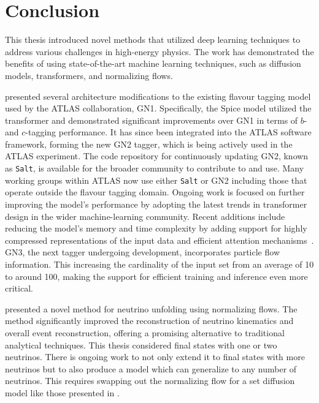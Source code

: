 \chapter{Conclusion}
\label{ch:conclusion}

This thesis introduced novel methods that utilized deep learning techniques to address various challenges in high-energy physics.
The work has demonstrated the benefits of using state-of-the-art machine learning techniques, such as diffusion models, transformers, and normalizing flows.

 presented several architecture modifications to the existing flavour tagging model used by the ATLAS collaboration, GN1.
Specifically, the Spice model utilized the transformer and demonstrated significant improvements over GN1 in terms of $b$- and $c$-tagging performance.
It has since been integrated into the ATLAS software framework, forming the new GN2 tagger, which is being actively used in the ATLAS experiment.
The code repository for continuously updating GN2, known as \texttt{Salt}, is available for the broader community to contribute to and use.
Many working groups within ATLAS now use either \texttt{Salt} or GN2 including those that operate outside the flavour tagging domain.
Ongoing work is focused on further improving the model's performance by adopting the latest trends in transformer design in the wider machine-learning community.
Recent additions include reducing the model's memory and time complexity by adding support for highly compressed representations of the input data and efficient attention mechanisms~\cite{FlashAttentionFastMemoryEfficient}.
GN3, the next tagger undergoing development, incorporates particle flow information.
This increasing the cardinality of the input set from an average of 10 to around 100, making the support for efficient training and inference even more critical.

 presented a novel method for neutrino unfolding using normalizing flows.
The \vvflows method significantly improved the reconstruction of neutrino kinematics and overall event reconstruction, offering a promising alternative to traditional analytical techniques.
This thesis considered final states with one or two neutrinos.
There is ongoing work to not only extend it to final states with more neutrinos but to also produce a model which can generalize to any number of neutrinos.
This requires swapping out the normalizing flow for a set diffusion model like those presented in .

